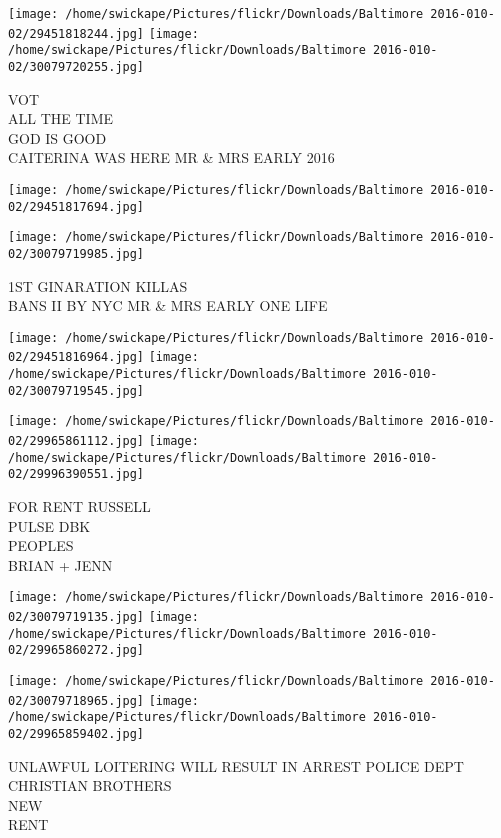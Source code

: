 \documentclass[10pt,letterpaper]{article}
\begin{document}
\texttt{[image: /home/swickape/Pictures/flickr/Downloads/Baltimore 2016-010-02/29451818244.jpg]}
\texttt{[image: /home/swickape/Pictures/flickr/Downloads/Baltimore 2016-010-02/30079720255.jpg]}

VOT\\
ALL THE TIME\\
GOD IS GOOD\\
CAITERINA WAS HERE MR \& MRS EARLY 2016\\
\pagebreak

\texttt{[image: /home/swickape/Pictures/flickr/Downloads/Baltimore 2016-010-02/29451817694.jpg]}

\vspace{0.25in}
\texttt{[image: /home/swickape/Pictures/flickr/Downloads/Baltimore 2016-010-02/30079719985.jpg]}

1ST GINARATION KILLAS\\
BANS II BY NYC MR \& MRS EARLY ONE LIFE\\
\pagebreak

\texttt{[image: /home/swickape/Pictures/flickr/Downloads/Baltimore 2016-010-02/29451816964.jpg]}
\texttt{[image: /home/swickape/Pictures/flickr/Downloads/Baltimore 2016-010-02/30079719545.jpg]}

\texttt{[image: /home/swickape/Pictures/flickr/Downloads/Baltimore 2016-010-02/29965861112.jpg]}
\texttt{[image: /home/swickape/Pictures/flickr/Downloads/Baltimore 2016-010-02/29996390551.jpg]}

FOR RENT RUSSELL\\
PULSE DBK\\
PEOPLES\\
BRIAN + JENN\\
\pagebreak

\texttt{[image: /home/swickape/Pictures/flickr/Downloads/Baltimore 2016-010-02/30079719135.jpg]}
\texttt{[image: /home/swickape/Pictures/flickr/Downloads/Baltimore 2016-010-02/29965860272.jpg]}

\texttt{[image: /home/swickape/Pictures/flickr/Downloads/Baltimore 2016-010-02/30079718965.jpg]}
\texttt{[image: /home/swickape/Pictures/flickr/Downloads/Baltimore 2016-010-02/29965859402.jpg]}

UNLAWFUL LOITERING WILL RESULT IN ARREST POLICE DEPT\\
CHRISTIAN BROTHERS\\
NEW\\
RENT\\
\pagebreak
\end{document}
